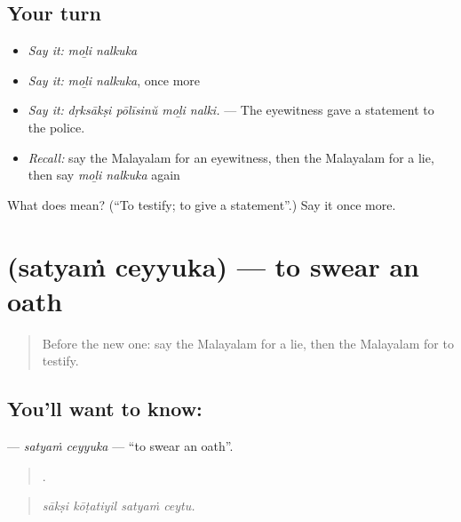 \subsection*{Your turn}
\begin{itemize}
\raggedright
  \item \emph{Say it:} \emph{moḻi nalkuka}
  \item \emph{Say it:} \emph{moḻi nalkuka}, once more
  \item \emph{Say it:} \emph{dṛksākṣi pōlīsinŭ moḻi nalki.} — The eyewitness gave a statement to the police.
  \item \emph{Recall:} say the Malayalam for an eyewitness, then the Malayalam for a lie, then say \emph{moḻi nalkuka} again
\end{itemize}

\begin{tcolorbox}[breakable,colback=teal!4,colframe=teal!35!black,title={Before you move on}]
What does   mean? (\textquotedblleft{}To testify; to give a statement\textquotedblright{}.) Say it once more.
\end{tcolorbox}
\section[\texorpdfstring{\ml{സത്യം} \ml{ചെയ്യുക} (satyaṁ ceyyuka)}{സത്യം ചെയ്യുക (satyaṁ ceyyuka)}]{  (satyaṁ ceyyuka) — to swear an oath}

\label{lesson:ML-C370-satyam-ceyyuka}



\begin{quote}
Before the new one: say the Malayalam for a lie, then the Malayalam for to testify.
\end{quote}

\subsection*{You'll want to know:  }
\textbf{ } — \emph{satyaṁ ceyyuka} — \textquotedblleft{}to swear an oath\textquotedblright{}.

\begin{quote}
   .
\end{quote}

\begin{quote}
\emph{sākṣi kōṭatiyil satyaṁ ceytu.}
\end{quote}


